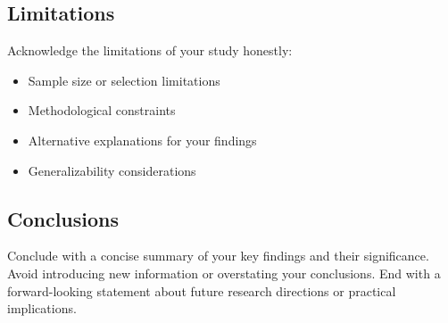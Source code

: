 \subsection{Limitations}

Acknowledge the limitations of your study honestly:
\begin{itemize}
    \item Sample size or selection limitations
    \item Methodological constraints
    \item Alternative explanations for your findings
    \item Generalizability considerations
\end{itemize}

\subsection{Conclusions}

Conclude with a concise summary of your key findings and their significance. Avoid introducing new information or overstating your conclusions. End with a forward-looking statement about future research directions or practical implications.

